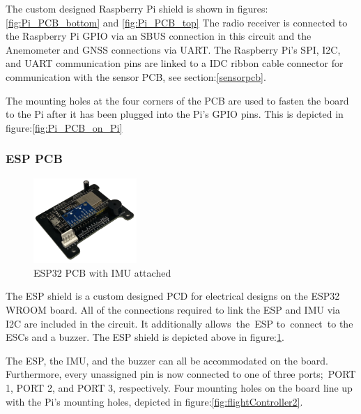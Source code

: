 \documentclass{article}
\begin{document}
The custom designed Raspberry Pi shield is shown in figures:\ref{fig:Pi_PCB_bottom} and \ref{fig:Pi_PCB_top} The radio receiver is connected to the Raspberry Pi GPIO via an SBUS connection in this circuit and the Anemometer and GNSS connections via UART. The Raspberry Pi's SPI, I2C, and UART communication 
pins are linked to a IDC ribbon cable connector for communication with the sensor PCB, see section:\ref{sensorpcb}.

The mounting holes at the four corners of the PCB are used to fasten the board to the Pi after it has been plugged into the Pi's GPIO pins. This is depicted in figure:\ref{fig:Pi_PCB_on_Pi}

\subsubsection{ESP PCB}
\begin{figure}[H]
  \centering
  \includegraphics[width=0.35\textwidth]{Pictures/Esp_IMU_board.png}
  \caption{ESP32 PCB with IMU attached}
  \label{fig:Esp_IMU_PCB}
\end{figure}
The ESP shield is a custom designed PCD for electrical designs on the ESP32 WROOM board. All of the connections required to link the ESP and IMU via I2C are included in the circuit. It additionally allows the ESP to connect to the ESCs and a buzzer. The ESP shield is depicted above in figure:\ref{fig:Esp_IMU_PCB}.

The ESP, the IMU, and the buzzer can all be accommodated on the board. Furthermore, every unassigned pin is now connected to one of three ports; PORT 1, PORT 2, and PORT 3, respectively. Four mounting holes on the board line up with the Pi's mounting holes, depicted in figure:\ref{fig:flightController2}.
\end{document}
